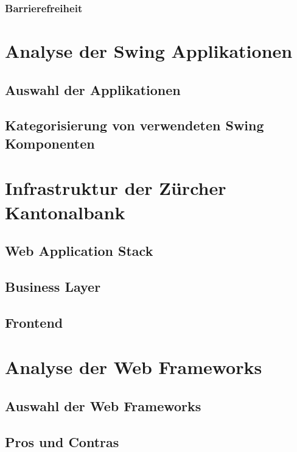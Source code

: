 \documentclass[abstracton, listof=totocnumbered,
bibliography=totocnumbered]{scrreprt}
\begin{document}
  \subsection{Barrierefreiheit}
  
  \chapter{Analyse der Swing Applikationen}
  
  \section{Auswahl der Applikationen}
  
  \section{Kategorisierung von verwendeten Swing Komponenten}
  
  \chapter{Infrastruktur der Zürcher Kantonalbank}
  
  \section{Web Application Stack}
  
  \section{Business Layer}
  
  \section{Frontend}
  
  \chapter{Analyse der Web Frameworks}
  
  \section{Auswahl der Web Frameworks}
  
  \section{Pros und Contras}
  
\end{document}
